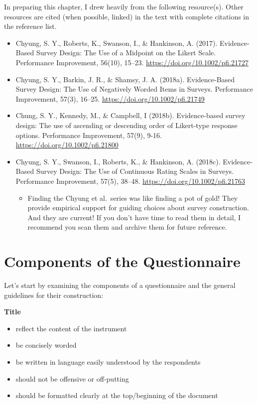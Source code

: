 \documentclass[
  english,
]{book}
\providecommand{\tightlist}{%
  \setlength{\itemsep}{0pt}\setlength{\parskip}{0pt}}
\begin{document}
In preparing this chapter, I drew heavily from the following resource(s). Other resources are cited (when possible, linked) in the text with complete citations in the reference list.

\begin{itemize}
\tightlist
\item
  Chyung, S. Y., Roberts, K., Swanson, I., \& Hankinson, A. (2017). Evidence-Based Survey Design: The Use of a Midpoint on the Likert Scale. Performance Improvement, 56(10), 15--23. \url{https://doi.org/10.1002/pfi.21727}
\item
  Chyung, S. Y., Barkin, J. R., \& Shamsy, J. A. (2018a). Evidence‐Based Survey Design: The Use of Negatively Worded Items in Surveys. Performance Improvement, 57(3), 16--25. \url{https://doi.org/10.1002/pfi.21749}
\item
  Chung, S. Y., Kennedy, M., \& Campbell, I (2018b). Evidence-based survey design: The use of ascending or descending order of Likert-type response options. Performance Improvement, 57(9), 9-16. \url{https://doi.org/10.1002/pfi.21800}
\item
  Chyung, S. Y., Swanson, I., Roberts, K., \& Hankinson, A. (2018c). Evidence‐Based Survey Design: The Use of Continuous Rating Scales in Surveys. Performance Improvement, 57(5), 38--48. \url{https://doi.org/10.1002/pfi.21763}

  \begin{itemize}
  \tightlist
  \item
    Finding the Chyung et al.~series was like finding a pot of gold! They provide empirical support for guiding choices about survey construction. And they are current! If you don't have time to read them in detail, I recommend you scan them and archive them for future reference.
  \end{itemize}
\end{itemize}

\hypertarget{components-of-the-questionnaire}{%
\section{Components of the Questionnaire}\label{components-of-the-questionnaire}}

Let's start by examining the components of a questionnaire and the general guidelines for their construction\citep{colton_designing_2015, pershing_ineffective_2001}:

\textbf{Title}

\begin{itemize}
\tightlist
\item
  reflect the content of the instrument
\item
  be concisely worded
\item
  be written in language easily understood by the respondents
\item
  should not be offensive or off-putting
\item
  should be formatted clearly at the top/beginning of the document
\end{itemize}
\end{document}
